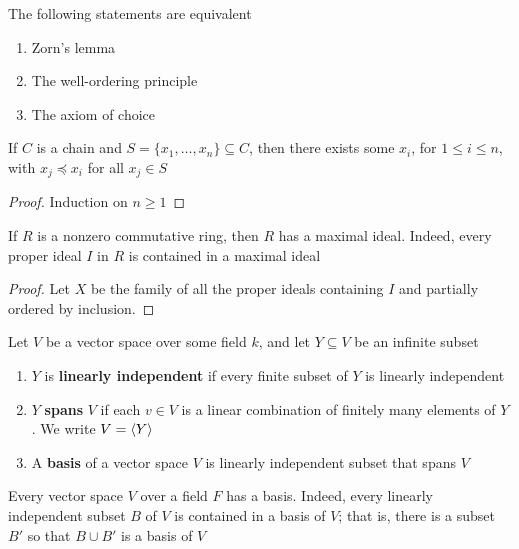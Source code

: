 \documentclass[11pt]{article}
\begin{document}
\begin{theorem}[]
The following statements are equivalent
\begin{enumerate}
\item Zorn's lemma
\item The well-ordering principle
\item The axiom of choice
\end{enumerate}
\end{theorem}

\begin{proposition}[]
\label{prop6.45}
If \(C\) is a chain and \(S=\{x_1,\dots,x_n\}\subseteq C\), then there exists
some \(x_i\), for \(1\le i\le n\), with \(x_j\preceq x_i\) for all \(x_j\in S\)
\end{proposition}
\begin{proof}
Induction on \(n\ge1\)
\end{proof}

\begin{theorem}[]
\label{nthm5.43}
If \(R\) is a nonzero commutative ring, then \(R\) has a maximal ideal. Indeed,
every proper ideal \(I\) in \(R\) is contained in a maximal ideal
\end{theorem}

\begin{proof}
Let \(X\)  be the family of all the proper ideals containing \(I\) and
partially ordered by inclusion.
\end{proof}

\begin{definition}[]
Let \(V\) be a vector space over some field \(k\), and let \(Y\subseteq V\) be an
infinite subset 
\begin{enumerate}
\item \(Y\) is \textbf{linearly independent} if every finite subset of \(Y\) is linearly independent
\item \(Y\) \textbf{spans} \(V\) if each \(v\in V\) is a linear combination of finitely many
elements of \(Y\). We write \(V=\langle Y\rangle\)
\item A \textbf{basis} of a vector space \(V\) is linearly independent subset that spans \(V\)
\end{enumerate}
\end{definition}

\begin{theorem}[]
Every vector space \(V\) over a field \(F\) has a basis. Indeed, every linearly
independent subset \(B\) of \(V\) is contained in a basis of \(V\); that is, there
is a subset \(B'\) so that \(B\cup B'\) is a basis of \(V\)
\end{theorem}
\end{document}
